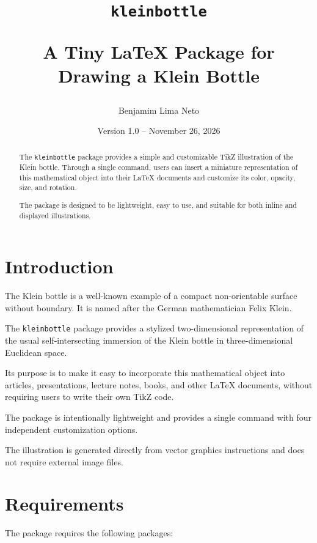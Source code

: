 \documentclass[12pt,a4paper]{article}
\title{%
    \leavevmode
    \klein[color=ManualBlue,scale=5]
    \par\vspace{0.4cm}
    \texttt{kleinbottle}
    \par\vspace{0.2cm}
    {\large A Tiny \LaTeX{} Package for Drawing a Klein Bottle}
}
\author{Benjamim Lima Neto}
\date{Version 1.0 -- November 26, 2026}
\begin{document}
\maketitle
\begin{abstract}

The \texttt{kleinbottle} package provides a simple and
customizable TikZ illustration of the Klein bottle.
Through a single command, users can insert a miniature
representation of this mathematical object into their
\LaTeX{} documents and customize its color, opacity,
size, and rotation.

The package is designed to be lightweight, easy to use,
and suitable for both inline and displayed illustrations.

\end{abstract}

\tableofcontents

\section{Introduction}

The Klein bottle is a well-known example of a compact
non-orientable surface without boundary. It is named
after the German mathematician Felix Klein.

The \texttt{kleinbottle} package provides a stylized
two-dimensional representation of the usual
self-intersecting immersion of the Klein bottle
in three-dimensional Euclidean space.

Its purpose is to make it easy to incorporate this
mathematical object into articles, presentations,
lecture notes, books, and other \LaTeX{} documents,
without requiring users to write their own TikZ code.

The package is intentionally lightweight and provides
a single command with four independent customization
options.

The illustration is generated directly from vector
graphics instructions and does not require external
image files.

\section{Requirements}

The package requires the following packages:
\end{document}

